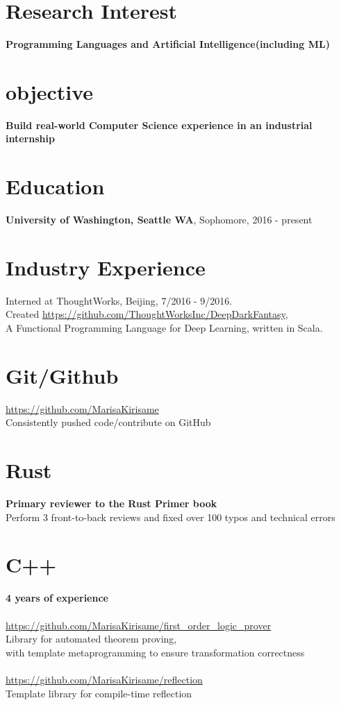 \documentclass[margin,line]{res}
\begin{document}

\begin{resume}

\section{\sc Research Interest}
\textbf{Programming Languages and Artificial Intelligence(including ML)}


\section{\sc objective}
\textbf{Build real-world Computer Science experience in an industrial internship}

\section{\sc Education}
\textbf{University of Washington, Seattle WA}, Sophomore, 2016 - present

\section{\sc Industry Experience} Interned at ThoughtWorks, Beijing, 7/2016 - 9/2016. \\ Created \url{https://github.com/ThoughtWorksInc/DeepDarkFantasy}, \\
A Functional Programming Language for Deep Learning, written in Scala. 

\section{\sc Git/Github}
\url{https://github.com/MarisaKirisame} \\
Consistently pushed code/contribute on GitHub

\section{\sc Rust}
\textbf{Primary reviewer to the Rust Primer book} \\
Perform 3 front-to-back reviews and fixed over 100 typos and technical errors

\section{\sc C++} 
\textbf{4 years of experience} \\
\\
\url{https://github.com/MarisaKirisame/first_order_logic_prover} \\
Library for automated theorem proving, \\
with template metaprogramming to ensure transformation correctness \\
\\
\url{https://github.com/MarisaKirisame/reflection} \\
Template library for compile-time reflection


\end{resume}
\end{document}
